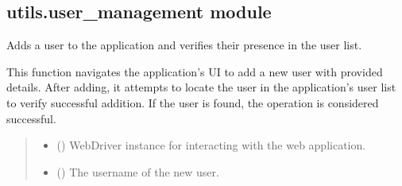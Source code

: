 \documentclass[letterpaper,10pt,english]{sphinxmanual}
\begin{document}
\subsection{utils.user\_management module}
\label{\detokenize{utils:module-utils.user_management}}\label{\detokenize{utils:utils-user-management-module}}

\begin{fulllineitems}
\label{\detokenize{utils:utils.user_management.add_user_and_check_presence}}
\pysigstartsignatures
{}
\pysigstopsignatures
\sphinxAtStartPar
Adds a user to the application and verifies their presence in the user list.

\sphinxAtStartPar
This function navigates the application’s UI to add a new user with provided details.
After adding, it attempts to locate the user in the application’s user list to verify
successful addition. If the user is found, the operation is considered successful.
\begin{quote}\begin{description}
\begin{itemize}
\item {} 
\sphinxAtStartPar
{} () \textendash{} WebDriver instance for interacting with the web application.

\item {} 
\sphinxAtStartPar
{} () \textendash{} The username of the new user.


\end{itemize}
\end{description}
\end{quote}
\end{fulllineitems}
\end{document}
